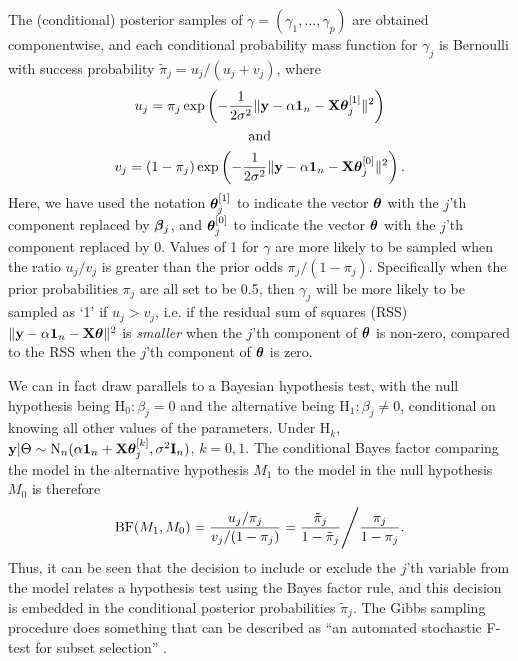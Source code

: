 \documentclass[11pt,twoside,openright]{report}
\begin{document}
The (conditional) posterior samples of $\gamma=(\gamma_1,\dots,\gamma_p)$ are obtained componentwise, and each conditional probability mass function for $\gamma_j$ is Bernoulli  with success probability $\tilde \pi_j = u_j / (u_j + v_j)$, where
\begin{align*}
  \begin{gathered}
    u_j = \pi_j \exp\left( - \frac{1}{2\sigma^2} \Vert {\mathbf y} - \alpha {\mathbf 1}_n - {\mathbf X}{\bm\theta}_j^{[1]} \Vert^2 \right) \\
    \text{and} \\
    v_j = (1-\pi_j) \exp\left( - \frac{1}{2\sigma^2} \Vert {\mathbf y} - \alpha {\mathbf 1}_n - {\mathbf X}{\bm\theta}_j^{[0]} \Vert^2 \right).
  \end{gathered}
\end{align*}
Here, we have used the notation ${\bm\theta}_j^{[1]}$ to indicate the vector ${\bm\theta}$ with the $j$'th component replaced by ${\bm\beta}_j$, and ${\bm\theta}_j^{[0]}$ to indicate the vector ${\bm\theta}$ with the $j$'th component replaced by 0.
Values of 1 for $\gamma$ are more likely to be sampled when the ratio $u_j / v_j$ is greater than the prior odds $\pi_j/(1-\pi_j)$.
Specifically when the prior probabilities $\pi_j$ are all set to be 0.5, then $\gamma_j$ will be more likely to be sampled as `1' if $u_j > v_j$, i.e. if the residual sum of squares (RSS) $\Vert {\mathbf y} - \alpha{\mathbf 1}_n - {\mathbf X}{\bm\theta} \Vert^2$ is \emph{smaller} when the $j$'th component of ${\bm\theta}$ is non-zero, compared to the RSS when the $j$'th component of ${\bm\theta}$ is zero.

We can in fact draw parallels to a Bayesian hypothesis test, with the null hypothesis being $\text{H}_0: \beta_j = 0$ and the alternative being $\text{H}_1: \beta_j \neq 0$, conditional on knowing all other values of the parameters.
Under $\text{H}_k$, ${\mathbf y}|\Theta \sim\operatorname{N}_n(\alpha {\mathbf 1}_n + {\mathbf X}{\bm\theta}_j^{[k]}, \sigma^2{\mathbf I}_n )$, $k=0,1$. 
The conditional Bayes factor comparing the model in the alternative hypothesis $M_1$ to the model in the null hypothesis $M_0$ is therefore
\begin{align*}
  \operatorname{BF}(M_1,M_0) 
  = \frac{u_j/\pi_j}{v_j/(1-\pi_j)} 
  = \frac{\tilde \pi_j  }{1-\tilde \pi_j} \Bigg/ \frac{\pi_j}{ 1-\pi_j }.
\end{align*}
Thus, it can be seen that the decision to include or exclude the $j$'th variable from the model relates a hypothesis test using the Bayes factor rule, and this decision is embedded in the conditional posterior probabilities $\tilde \pi_j$.
The Gibbs sampling procedure does something that can be described as ``an automated stochastic F-test for subset selection'' \citep{Kuo1998}.
\end{document}
